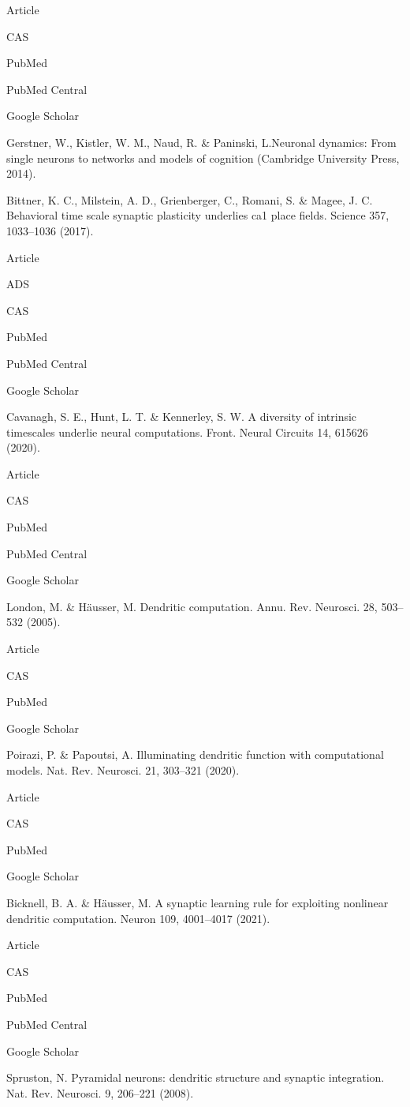 Article
 
CAS
 
PubMed
 
PubMed Central
 
Google Scholar
 

Gerstner, W., Kistler, W. M., Naud, R. & Paninski, L.Neuronal dynamics: From single neurons to networks and models of cognition (Cambridge University Press, 2014).

Bittner, K. C., Milstein, A. D., Grienberger, C., Romani, S. & Magee, J. C. Behavioral time scale synaptic plasticity underlies ca1 place fields. Science 357, 1033–1036 (2017).

Article
 
ADS
 
CAS
 
PubMed
 
PubMed Central
 
Google Scholar
 

Cavanagh, S. E., Hunt, L. T. & Kennerley, S. W. A diversity of intrinsic timescales underlie neural computations. Front. Neural Circuits 14, 615626 (2020).

Article
 
CAS
 
PubMed
 
PubMed Central
 
Google Scholar
 

London, M. & Häusser, M. Dendritic computation. Annu. Rev. Neurosci. 28, 503–532 (2005).

Article
 
CAS
 
PubMed
 
Google Scholar
 

Poirazi, P. & Papoutsi, A. Illuminating dendritic function with computational models. Nat. Rev. Neurosci. 21, 303–321 (2020).

Article
 
CAS
 
PubMed
 
Google Scholar
 

Bicknell, B. A. & Häusser, M. A synaptic learning rule for exploiting nonlinear dendritic computation. Neuron 109, 4001–4017 (2021).

Article
 
CAS
 
PubMed
 
PubMed Central
 
Google Scholar
 

Spruston, N. Pyramidal neurons: dendritic structure and synaptic integration. Nat. Rev. Neurosci. 9, 206–221 (2008).

